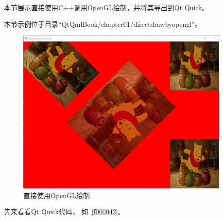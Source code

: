 本节展示直接使用C{\sourcefonttwo{}+}{\sourcefonttwo{}+}调用OpenGL绘制，并将其导出到Qt Quick。

本节示例位于目录“QtQmlBook/chapter01/directdrawbyopengl”。

\begin{figure}[htb] %
\marginnote{\setlength\fboxsep{2pt}\fbox{\footnotesize{\kaishu\figurename\,}\footnotesize{\ref{p000011}}}}\centering %
\includegraphics[width=0.95\textwidth]{../chapter01/directdrawbyopengl/the_app.png} %
\caption{直接使用OpenGL绘制} %
\label{p000011} %
\end{figure}


先来看看Qt Quick代码，
如\filesourcenumbernameone\ \ref{f000042}。

